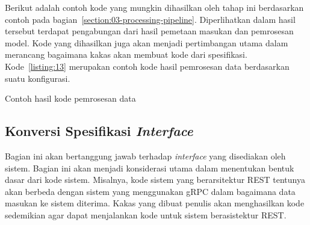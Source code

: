 Berikut adalah contoh kode yang mungkin dihasilkan oleh tahap ini berdasarkan contoh pada bagian~\ref{section:03-processing-pipeline}.
Diperlihatkan dalam hasil tersebut terdapat pengabungan dari hasil pemetaan masukan dan pemrosesan model.
Kode yang dihasilkan juga akan menjadi pertimbangan utama dalam merancang bagaimana kakas akan membuat kode dari spesifikasi.
Kode~\ref{listing:13} merupakan contoh kode hasil pemrosesan data berdasarkan suatu konfigurasi. 

\begin{code}
	\caption{Contoh hasil kode pemrosesan data}\label{listing:13}
\end{code}

\subsection{Konversi Spesifikasi \textit{Interface}}

Bagian ini akan bertanggung jawab terhadap \textit{interface} yang disediakan oleh sistem.
Bagian ini akan menjadi konsiderasi utama dalam menentukan bentuk dasar dari kode sistem.
Misalnya, kode sistem yang berarsitektur REST tentunya akan berbeda dengan sistem yang menggunakan gRPC dalam bagaimana data masukan ke sistem diterima.
Kakas yang dibuat penulis akan menghasilkan kode sedemikian agar dapat menjalankan kode untuk sistem berasistektur REST.\@
